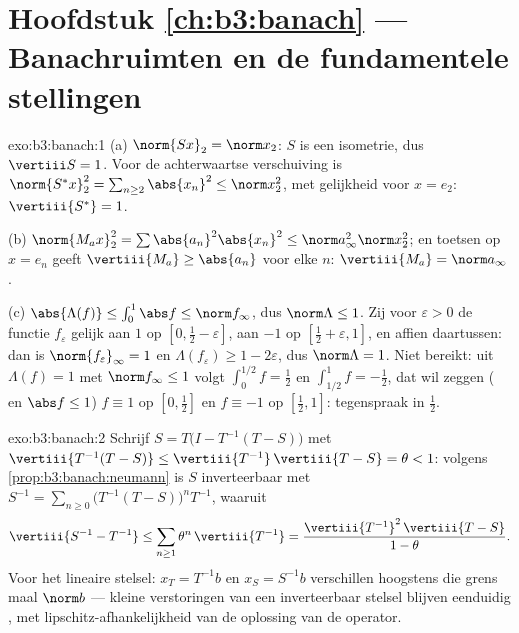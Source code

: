 \section*{Hoofdstuk \ref{ch:b3:banach} --- Banachruimten en de
fundamentele stellingen}

\begin{solution}{exo:b3:banach:1}
(a) $\norm{Sx}_2 = \norm x_2$: $S$ is een isometrie, dus
$\vertiii S = 1$. Voor de achterwaartse verschuiving is
$\norm{S^*x}_2^2 = \sum_{n \geq 2}\abs{x_n}^2 \leq \norm x_2^2$,
met gelijkheid voor $x = e_2$: $\vertiii{S^*} = 1$.

(b) $\norm{M_ax}_2^2 = \sum\abs{a_n}^2\abs{x_n}^2 \leq \norm
a_\infty^2\norm x_2^2$; en toetsen op $x = e_n$ geeft
$\vertiii{M_a} \geq \abs{a_n}$ voor elke $n$: $\vertiii{M_a} =
\norm a_\infty$.

(c) $\abs{\Lambda(f)} \leq \int_0^1\abs f \leq \norm f_\infty$,
dus $\norm\Lambda \leq 1$. Zij voor $\varepsilon > 0$ de functie
$f_\varepsilon$ gelijk aan $1$ op $[0, \frac12 - \varepsilon]$,
aan $-1$ op $[\frac12 + \varepsilon, 1]$, en affien daartussen:
dan is $\norm{f_\varepsilon}_\infty = 1$ en
$\Lambda(f_\varepsilon) \geq 1 - 2\varepsilon$, dus $\norm\Lambda
= 1$. Niet bereikt: uit $\Lambda(f) = 1$ met $\norm f_\infty \leq
1$ volgt $\int_0^{1/2}f = \frac12$ en $\int_{1/2}^1 f =
-\frac12$, dat wil zeggen ( en $\abs f \leq 1$) $f
\equiv 1$ op $[0, \frac12]$ en $f \equiv -1$ op $[\frac12, 1]$:
tegenspraak in $\frac12$.
\end{solution}

\begin{solution}{exo:b3:banach:2}
Schrijf $S = T\bigl(I - T^{-1}(T - S)\bigr)$ met
$\vertiii{T^{-1}(T-S)} \leq \vertiii{T^{-1}}\,\vertiii{T - S} =
\theta < 1$: volgens \cref{prop:b3:banach:neumann} is $S$
inverteerbaar met $S^{-1} = \sum_{n\geq0}\bigl(T^{-1}(T -
S)\bigr)^nT^{-1}$, waaruit
\[
\vertiii{S^{-1} - T^{-1}} \leq
\sum_{n\geq1}\theta^n\,\vertiii{T^{-1}}
= \frac{\vertiii{T^{-1}}^2\,\vertiii{T - S}}{1 - \theta}.
\]
Voor het lineaire stelsel: $x_T = T^{-1}b$ en $x_S = S^{-1}b$
verschillen hoogstens die grens maal $\norm b$ --- kleine
verstoringen van een inverteerbaar stelsel blijven eenduidig
, met lipschitz-afhankelijkheid van de oplossing van de
operator.
\end{solution}

